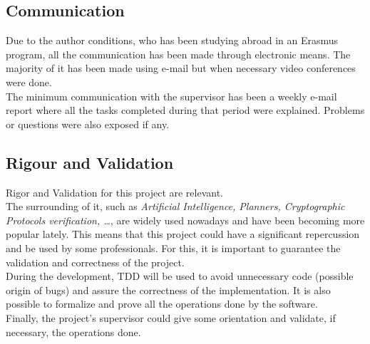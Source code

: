 \subsection{Communication}
Due to the author conditions, who has been studying abroad in an Erasmus program, all the communication has been made through electronic means. The majority of it has been made using e-mail but when necessary video conferences were done. \\
The minimum communication with the supervisor has been a weekly e-mail report where all the tasks completed during that period were explained. Problems or questions were also exposed if any.

\subsection{Rigour and Validation}
Rigor and Validation for this project are relevant. \\
The surrounding of it, such as \emph{Artificial Intelligence, Planners, Cryptographic Protocols verification, \ldots}, are widely used nowadays and have been becoming more popular lately. This means that this project could have a significant repercussion and be used by some professionals. For this, it is important to guarantee the validation and correctness of the project. \\
During the development, TDD will be used to avoid unnecessary code (possible origin of bugs) and assure the correctness of the implementation. It is also possible to formalize and prove all the operations done by the software.\\
Finally, the project's supervisor could give some orientation and validate, if necessary, the operations done.